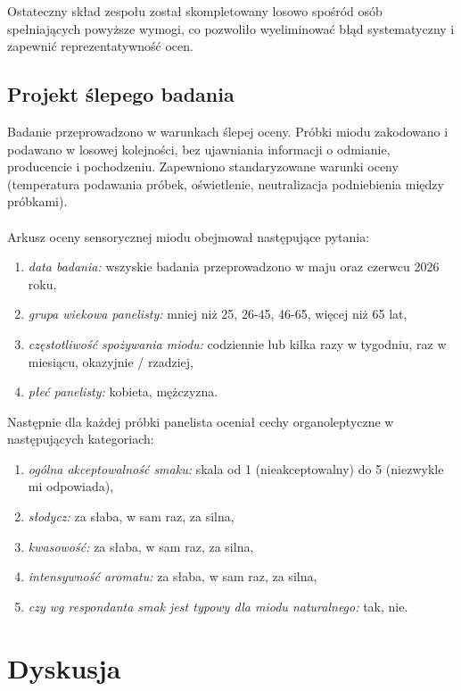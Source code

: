 \documentclass[12pt,a4paper]{article}
\begin{document}
Ostateczny skład zespołu został skompletowany losowo spośród osób spełniających powyższe wymogi, co pozwoliło wyeliminować błąd systematyczny i zapewnić reprezentatywność ocen.

\subsection{Projekt ślepego badania}

Badanie przeprowadzono w warunkach ślepej oceny. 
Próbki miodu zakodowano i podawano w losowej kolejności, bez ujawniania informacji o odmianie, producencie i pochodzeniu.
Zapewniono standaryzowane warunki oceny (temperatura podawania próbek, oświetlenie, neutralizacja podniebienia między próbkami).
\\
\\
Arkusz oceny sensorycznej miodu obejmował następujące pytania:
\begin{enumerate}[label=\roman*.]
  \item \textit{data badania:} wszyskie badania przeprowadzono w maju oraz czerwcu 2026 roku,
  \item \textit{grupa wiekowa panelisty:} mniej niż 25, 26-45, 46-65, więcej niż 65 lat,
  \item \textit{częstotliwość spożywania miodu:} codziennie lub kilka razy w tygodniu, raz w miesiącu, okazyjnie / rzadziej,
  \item \textit{płeć panelisty:} kobieta, mężczyzna.
\end{enumerate}
 
Następnie dla każdej próbki panelista oceniał cechy organoleptyczne w następujących kategoriach:

\begin{enumerate}[label=\roman*.]
  \item \textit{ogólna akceptowalność smaku:} skala od 1 (nieakceptowalny) do 5 (niezwykle mi odpowiada),
  \item \textit{słodycz:} za słaba, w sam raz, za silna,
  \item \textit{kwasowość:} za słaba, w sam raz, za silna,
  \item \textit{intensywność aromatu:} za słaba, w sam raz, za silna,
  \item \textit{czy wg respondanta smak jest typowy dla miodu naturalnego:} tak, nie.
\end{enumerate}



\section{Dyskusja}
\end{document}
